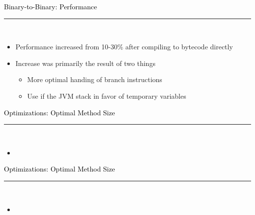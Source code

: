 \documentclass[letter]{seminar}
\begin{document}
\begin{slide}\raggedright
\renewcommand{\leftmargini}{5mm}
{\Large{\textcolor{black}{Binary-to-Binary: Performance}}}
\\\rule{\textwidth}{0.1pt}\\

\begin{itemize}


\item
        Performance increased from 10-30\%  after compiling to bytecode 
         directly

\item
        Increase was primarily the result of two things
\begin{itemize}


\item
            More optimal handing of branch instructions

\item
            Use if the JVM stack in favor of temporary variables


\end{itemize}

\end{itemize}


\end{slide}


\begin{slide}\raggedright
\renewcommand{\leftmargini}{5mm}
{\Large{\textcolor{black}{Optimizations: Optimal Method Size}}}
\\\rule{\textwidth}{0.1pt}\\

\begin{itemize}

\item \begin{figure}[H]
\begin{center}
\end{center}
\end{figure}

\end{itemize}


\end{slide}


\begin{slide}\raggedright
\renewcommand{\leftmargini}{5mm}
{\Large{\textcolor{black}{Optimizations: Optimal Method Size}}}
\\\rule{\textwidth}{0.1pt}\\

\begin{itemize}

\item \begin{figure}[H]
\begin{center}
\end{center}
\end{figure}

\end{itemize}


\end{slide}
\end{document}
